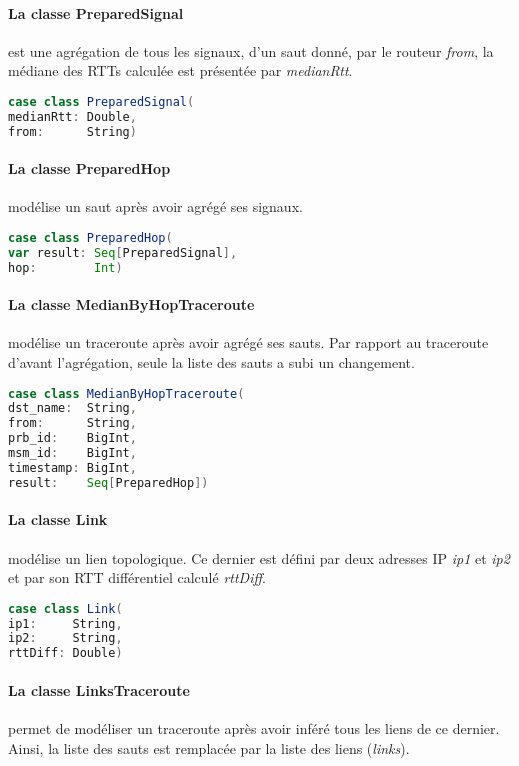 \paragraph{La classe PreparedSignal }  est une agrégation de tous les signaux, d'un saut donné, par le routeur \textit{from},  la médiane des RTTs calculée est présentée par \textit{medianRtt}.
\begin{lstlisting}[language=scala]
case class PreparedSignal(
medianRtt: Double,
from:      String)
\end{lstlisting}
\paragraph{La classe PreparedHop } modélise un saut après avoir agrégé ses signaux. 
\begin{lstlisting}[language=scala]
case class PreparedHop(
var result: Seq[PreparedSignal],
hop:        Int)
\end{lstlisting}


\paragraph{La classe MedianByHopTraceroute } modélise un traceroute après avoir agrégé ses sauts. Par rapport au traceroute d'avant l'agrégation, seule la liste des sauts  a subi un changement. 
\begin{lstlisting}[language=scala]
case class MedianByHopTraceroute(
dst_name:  String,
from:      String,
prb_id:    BigInt,
msm_id:    BigInt,
timestamp: BigInt,
result:    Seq[PreparedHop])
\end{lstlisting}


\paragraph{La classe Link} modélise un lien topologique. Ce dernier est défini par deux adresses IP  \textit{ip1} et \textit{ip2} et par son RTT différentiel calculé \textit{rttDiff}.
\begin{lstlisting}[language=scala]
case class Link(
ip1:     String,
ip2:     String,
rttDiff: Double)
\end{lstlisting}

\paragraph{La classe LinksTraceroute} permet de modéliser un traceroute après avoir inféré tous les liens de ce dernier. Ainsi, la liste des sauts est remplacée par la liste des liens (\textit{links}). 

